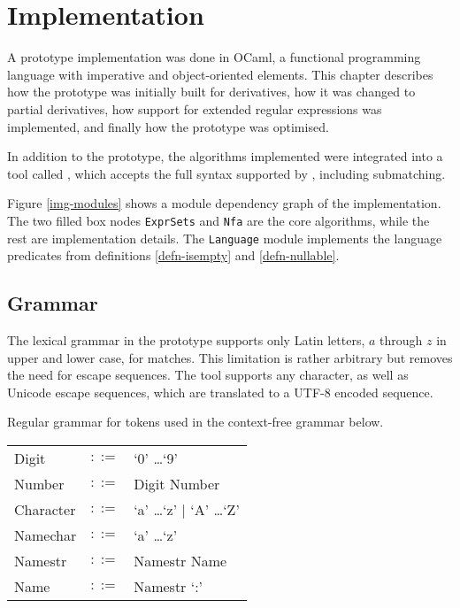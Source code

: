 \chapter{Implementation}
\label{implementation}

A prototype implementation was done in OCaml, a functional programming language
with imperative and object-oriented elements. This chapter describes how the
prototype was initially built for derivatives, how it was changed to partial
derivatives, how support for extended regular expressions was implemented, and
finally how the prototype was optimised.

In addition to the prototype, the algorithms implemented were integrated into a
tool called \dreml, which accepts the full syntax supported by \ocamllex,
including submatching.

Figure \ref{img-modules} shows a module dependency graph of the \dreml{}
implementation. The two filled box nodes \texttt{ExprSets} and \texttt{Nfa} are
the core algorithms, while the rest are implementation details. The
\texttt{Language} module implements the language predicates from definitions
\ref{defn-isempty} and \ref{defn-nullable}.



\section{Grammar}

The lexical grammar in the prototype supports only Latin letters, $a$ through
$z$ in upper and lower case, for matches. This limitation is rather arbitrary
but removes the need for escape sequences. The \dreml{} tool supports any
character, as well as Unicode escape sequences, which are translated to a UTF-8
encoded sequence.

\needspace{4cm}
\begin{defn}
   \label{defn-gram-reg}
   Regular grammar for tokens used in the context-free grammar below.

   \begin{tabular}{lrl}
      Digit	& $::=$	& `0' \dots `9'				\\
      Number	& $::=$	& Digit Number				\\
      Character	& $::=$	& `a' \dots `z' $|$ `A' \dots `Z'	\\
      Namechar	& $::=$	& `a' \dots `z'				\\
      Namestr	& $::=$	& Namestr Name				\\
      Name	& $::=$	& Namestr `:'				\\
   \end{tabular}
\end{defn}

